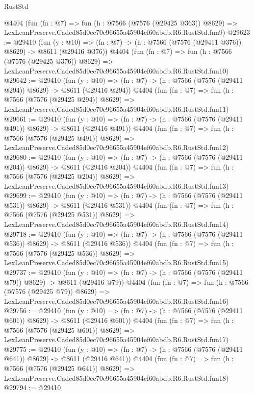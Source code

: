 \begin{lexlean}{RustStd}
\begin{coremodule}
    @4404
    (fun (fn : @7) =>
    fun (h : @7566 (@7576 (@29425 @363)) @8629) =>
    LexLeanPreserve.Caded85d0ec70c96655a45904ef60abdb.R6.RustStd.fun9)
@29623 := @29410
    (fun (y : @10) => (fn : @7) -> (h : @7566 (@7576 (@29411 @376)) @8629) -> @8611 (@29416 @376))
    @4404
    (fun (fn : @7) =>
    fun (h : @7566 (@7576 (@29425 @376)) @8629) =>
    LexLeanPreserve.Caded85d0ec70c96655a45904ef60abdb.R6.RustStd.fun10)
@29642 := @29410
    (fun (y : @10) => (fn : @7) -> (h : @7566 (@7576 (@29411 @294)) @8629) -> @8611 (@29416 @294))
    @4404
    (fun (fn : @7) =>
    fun (h : @7566 (@7576 (@29425 @294)) @8629) =>
    LexLeanPreserve.Caded85d0ec70c96655a45904ef60abdb.R6.RustStd.fun11)
@29661 := @29410
    (fun (y : @10) => (fn : @7) -> (h : @7566 (@7576 (@29411 @491)) @8629) -> @8611 (@29416 @491))
    @4404
    (fun (fn : @7) =>
    fun (h : @7566 (@7576 (@29425 @491)) @8629) =>
    LexLeanPreserve.Caded85d0ec70c96655a45904ef60abdb.R6.RustStd.fun12)
@29680 := @29410
    (fun (y : @10) => (fn : @7) -> (h : @7566 (@7576 (@29411 @204)) @8629) -> @8611 (@29416 @204))
    @4404
    (fun (fn : @7) =>
    fun (h : @7566 (@7576 (@29425 @204)) @8629) =>
    LexLeanPreserve.Caded85d0ec70c96655a45904ef60abdb.R6.RustStd.fun13)
@29699 := @29410
    (fun (y : @10) => (fn : @7) -> (h : @7566 (@7576 (@29411 @531)) @8629) -> @8611 (@29416 @531))
    @4404
    (fun (fn : @7) =>
    fun (h : @7566 (@7576 (@29425 @531)) @8629) =>
    LexLeanPreserve.Caded85d0ec70c96655a45904ef60abdb.R6.RustStd.fun14)
@29718 := @29410
    (fun (y : @10) => (fn : @7) -> (h : @7566 (@7576 (@29411 @536)) @8629) -> @8611 (@29416 @536))
    @4404
    (fun (fn : @7) =>
    fun (h : @7566 (@7576 (@29425 @536)) @8629) =>
    LexLeanPreserve.Caded85d0ec70c96655a45904ef60abdb.R6.RustStd.fun15)
@29737 := @29410
    (fun (y : @10) => (fn : @7) -> (h : @7566 (@7576 (@29411 @79)) @8629) -> @8611 (@29416 @79))
    @4404
    (fun (fn : @7) =>
    fun (h : @7566 (@7576 (@29425 @79)) @8629) =>
    LexLeanPreserve.Caded85d0ec70c96655a45904ef60abdb.R6.RustStd.fun16)
@29756 := @29410
    (fun (y : @10) => (fn : @7) -> (h : @7566 (@7576 (@29411 @601)) @8629) -> @8611 (@29416 @601))
    @4404
    (fun (fn : @7) =>
    fun (h : @7566 (@7576 (@29425 @601)) @8629) =>
    LexLeanPreserve.Caded85d0ec70c96655a45904ef60abdb.R6.RustStd.fun17)
@29775 := @29410
    (fun (y : @10) => (fn : @7) -> (h : @7566 (@7576 (@29411 @641)) @8629) -> @8611 (@29416 @641))
    @4404
    (fun (fn : @7) =>
    fun (h : @7566 (@7576 (@29425 @641)) @8629) =>
    LexLeanPreserve.Caded85d0ec70c96655a45904ef60abdb.R6.RustStd.fun18)
@29794 := @29410

\end{coremodule}
\end{lexlean}
